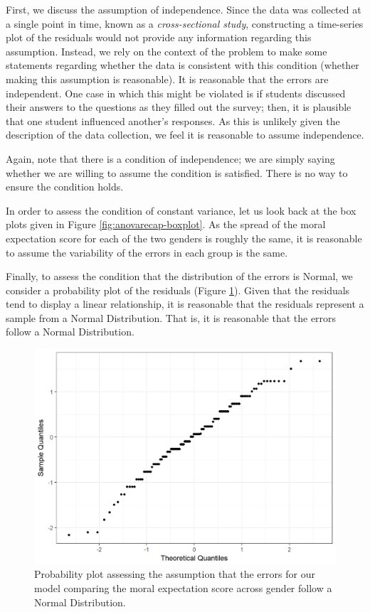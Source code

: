 \documentclass[]{book}
\theoremstyle{plain}
\theoremstyle{mydefn}
\theoremstyle{myexmpl}
\theoremstyle{remark}
\begin{document}
First, we discuss the assumption of independence. Since the data was
collected at a single point in time, known as a \emph{cross-sectional
study}, constructing a time-series plot of the residuals would not
provide any information regarding this assumption. Instead, we rely on
the context of the problem to make some statements regarding whether the
data is consistent with this condition (whether making this assumption
is reasonable). It is reasonable that the errors are independent. One
case in which this might be violated is if students discussed their
answers to the questions as they filled out the survey; then, it is
plausible that one student influenced another's responses. As this is
unlikely given the description of the data collection, we feel it is
reasonable to assume independence.

Again, note that there is a condition of independence; we are simply
saying whether we are willing to assume the condition is satisfied.
There is no way to ensure the condition holds.

In order to assess the condition of constant variance, let us look back
at the box plots given in Figure \ref{fig:anovarecap-boxplot}. As the
spread of the moral expectation score for each of the two genders is
roughly the same, it is reasonable to assume the variability of the
errors in each group is the same.

Finally, to assess the condition that the distribution of the errors is
Normal, we consider a probability plot of the residuals (Figure
\ref{fig:anovarecap-resids-probplot}). Given that the residuals tend to
display a linear relationship, it is reasonable that the residuals
represent a sample from a Normal Distribution. That is, it is reasonable
that the errors follow a Normal Distribution.

\begin{figure}

{\centering \includegraphics[width=0.8\linewidth]{./Images/anovarecap-resids-probplot-1} 

}

\caption{Probability plot assessing the assumption that the errors for our model comparing the moral expectation score across gender follow a Normal Distribution.}\label{fig:anovarecap-resids-probplot}
\end{figure}
\end{document}

